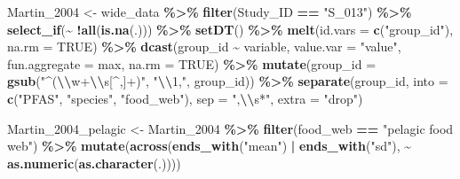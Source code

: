 \documentclass[
]{article}
\newenvironment{Shaded}{\begin{snugshade}}{\end{snugshade}}
\newcommand{\AttributeTok}[1]{\textcolor[rgb]{0.13,0.29,0.53}{#1}}
\newcommand{\ConstantTok}[1]{\textcolor[rgb]{0.56,0.35,0.01}{#1}}
\newcommand{\FunctionTok}[1]{\textcolor[rgb]{0.13,0.29,0.53}{\textbf{#1}}}
\newcommand{\NormalTok}[1]{#1}
\newcommand{\OtherTok}[1]{\textcolor[rgb]{0.56,0.35,0.01}{#1}}
\newcommand{\SpecialCharTok}[1]{\textcolor[rgb]{0.81,0.36,0.00}{\textbf{#1}}}
\newcommand{\StringTok}[1]{\textcolor[rgb]{0.31,0.60,0.02}{#1}}
\begin{document}
\begin{Shaded}
\begin{Highlighting}[]
\NormalTok{Martin\_2004 }\OtherTok{\textless{}{-}}\NormalTok{ wide\_data }\SpecialCharTok{\%\textgreater{}\%} 
  \FunctionTok{filter}\NormalTok{(Study\_ID }\SpecialCharTok{==} \StringTok{"S\_013"}\NormalTok{) }\SpecialCharTok{\%\textgreater{}\%}
  \FunctionTok{select\_if}\NormalTok{(}\SpecialCharTok{\textasciitilde{}} \SpecialCharTok{!}\FunctionTok{all}\NormalTok{(}\FunctionTok{is.na}\NormalTok{(.))) }\SpecialCharTok{\%\textgreater{}\%} 
  \FunctionTok{setDT}\NormalTok{() }\SpecialCharTok{\%\textgreater{}\%} 
  \FunctionTok{melt}\NormalTok{(}\AttributeTok{id.vars =} \FunctionTok{c}\NormalTok{(}\StringTok{"group\_id"}\NormalTok{), }\AttributeTok{na.rm =} \ConstantTok{TRUE}\NormalTok{) }\SpecialCharTok{\%\textgreater{}\%} 
  \FunctionTok{dcast}\NormalTok{(group\_id }\SpecialCharTok{\textasciitilde{}}\NormalTok{ variable, }\AttributeTok{value.var =} \StringTok{"value"}\NormalTok{, }\AttributeTok{fun.aggregate =}\NormalTok{ max, }\AttributeTok{na.rm =} \ConstantTok{TRUE}\NormalTok{) }\SpecialCharTok{\%\textgreater{}\%} 
  \FunctionTok{mutate}\NormalTok{(}\AttributeTok{group\_id =} \FunctionTok{gsub}\NormalTok{(}\StringTok{"\^{}(}\SpecialCharTok{\textbackslash{}\textbackslash{}}\StringTok{w+}\SpecialCharTok{\textbackslash{}\textbackslash{}}\StringTok{s[\^{},]+)"}\NormalTok{, }\StringTok{"}\SpecialCharTok{\textbackslash{}\textbackslash{}}\StringTok{1,"}\NormalTok{, group\_id)) }\SpecialCharTok{\%\textgreater{}\%} 
  \FunctionTok{separate}\NormalTok{(group\_id, }\AttributeTok{into =} \FunctionTok{c}\NormalTok{(}\StringTok{"PFAS"}\NormalTok{, }\StringTok{"species"}\NormalTok{, }\StringTok{"food\_web"}\NormalTok{), }\AttributeTok{sep =} \StringTok{",}\SpecialCharTok{\textbackslash{}\textbackslash{}}\StringTok{s*"}\NormalTok{, }\AttributeTok{extra =} \StringTok{"drop"}\NormalTok{)}

\NormalTok{Martin\_2004\_pelagic }\OtherTok{\textless{}{-}}\NormalTok{ Martin\_2004 }\SpecialCharTok{\%\textgreater{}\%} 
  \FunctionTok{filter}\NormalTok{(food\_web }\SpecialCharTok{==} \StringTok{"pelagic food web"}\NormalTok{) }\SpecialCharTok{\%\textgreater{}\%}
  \FunctionTok{mutate}\NormalTok{(}\FunctionTok{across}\NormalTok{(}\FunctionTok{ends\_with}\NormalTok{(}\StringTok{"mean"}\NormalTok{) }\SpecialCharTok{|} \FunctionTok{ends\_with}\NormalTok{(}\StringTok{"sd"}\NormalTok{), }\SpecialCharTok{\textasciitilde{}} \FunctionTok{as.numeric}\NormalTok{(}\FunctionTok{as.character}\NormalTok{(.))))}


\end{Highlighting}
\end{Shaded}
\end{document}
